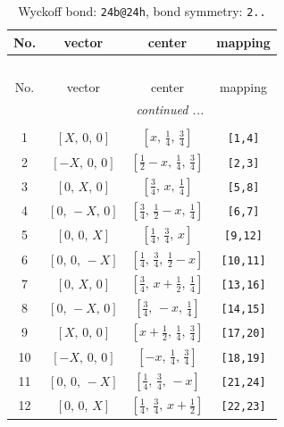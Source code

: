 \documentclass[fleqn,8pt]{jsarticle}
\begin{document}
\begin{longtable}{cccc}
\caption{Wyckoff bond: {\tt 24b@24h}, bond symmetry: {\tt 2..}}
 \\
 \hline \hline
No. & vector & center & mapping \\ \hline \endfirsthead

\multicolumn{3}{l}{\tablename\ \thetable{}} \\
 \hline \hline
No. & vector & center & mapping \\ \hline \endhead

 \hline \hline
\multicolumn{3}{r}{\footnotesize\it continued ...} \\ \endfoot

 \hline \hline
\multicolumn{3}{r}{} \\ \endlastfoot

1 & $\left[ X,\, 0,\, 0 \right]$ & $\left[ x,\, \frac{1}{4},\, \frac{3}{4} \right]$ & {\tt [1,4]} \\ \hline
2 & $\left[ - X,\, 0,\, 0 \right]$ & $\left[ \frac{1}{2} - x,\, \frac{1}{4},\, \frac{3}{4} \right]$ & {\tt [2,3]} \\ \hline
3 & $\left[ 0,\, X,\, 0 \right]$ & $\left[ \frac{3}{4},\, x,\, \frac{1}{4} \right]$ & {\tt [5,8]} \\ \hline
4 & $\left[ 0,\, - X,\, 0 \right]$ & $\left[ \frac{3}{4},\, \frac{1}{2} - x,\, \frac{1}{4} \right]$ & {\tt [6,7]} \\ \hline
5 & $\left[ 0,\, 0,\, X \right]$ & $\left[ \frac{1}{4},\, \frac{3}{4},\, x \right]$ & {\tt [9,12]} \\ \hline
6 & $\left[ 0,\, 0,\, - X \right]$ & $\left[ \frac{1}{4},\, \frac{3}{4},\, \frac{1}{2} - x \right]$ & {\tt [10,11]} \\ \hline
7 & $\left[ 0,\, X,\, 0 \right]$ & $\left[ \frac{3}{4},\, x + \frac{1}{2},\, \frac{1}{4} \right]$ & {\tt [13,16]} \\ \hline
8 & $\left[ 0,\, - X,\, 0 \right]$ & $\left[ \frac{3}{4},\, - x,\, \frac{1}{4} \right]$ & {\tt [14,15]} \\ \hline
9 & $\left[ X,\, 0,\, 0 \right]$ & $\left[ x + \frac{1}{2},\, \frac{1}{4},\, \frac{3}{4} \right]$ & {\tt [17,20]} \\ \hline
10 & $\left[ - X,\, 0,\, 0 \right]$ & $\left[ - x,\, \frac{1}{4},\, \frac{3}{4} \right]$ & {\tt [18,19]} \\ \hline
11 & $\left[ 0,\, 0,\, - X \right]$ & $\left[ \frac{1}{4},\, \frac{3}{4},\, - x \right]$ & {\tt [21,24]} \\ \hline
12 & $\left[ 0,\, 0,\, X \right]$ & $\left[ \frac{1}{4},\, \frac{3}{4},\, x + \frac{1}{2} \right]$ & {\tt [22,23]} \\ \hline

\end{longtable}
\end{document}
